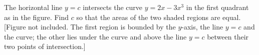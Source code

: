 The horizontal line $y=c$ intersects the curve $y = 2x - 3x^3$
in the first quadrant as in the figure. Find $c$ so that the areas of the
two shaded regions are equal. [Figure not included. The first region is
bounded by the $y$-axis, the line $y=c$ and the curve; the other lies
under the curve and above the line $y=c$ between their two points of
intersection.]
